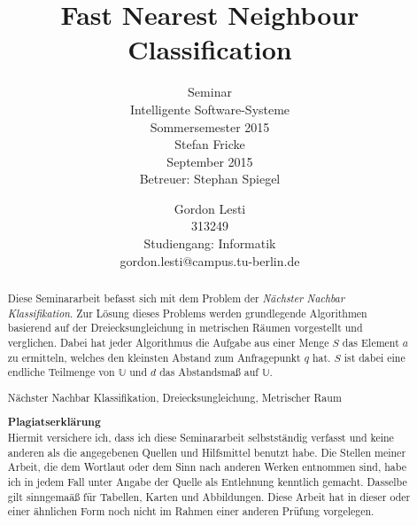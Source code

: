 \documentclass[deutsch,runningheads,a4paper]{llncs}
\newcommand{\keywords}[1]{\par\addvspace\baselineskip
\noindent\keywordname\enspace\ignorespaces#1}
\begin{document}
  \setcounter{tocdepth}{2}
  \makeatletter
  \renewcommand*\l@author[2]{}
  \renewcommand*\l@title[2]{}
  \makeatletter
  \title{Fast Nearest Neighbour Classification}
  \subtitle{\textnormal{\small{Seminar\\Intelligente Software-Systeme\\Sommersemester 2015}\\\vspace{1\baselineskip}
    Stefan Fricke\\\vspace{15\baselineskip} September 2015\\Betreuer: Stephan Spiegel\\\vspace{2\baselineskip}}}
  
  \author{Gordon Lesti\\313249\\Studiengang: Informatik\\gordon.lesti@campus.tu-berlin.de}
  
  
  \maketitle
  \newpage
  
  \begin{abstract}
    Diese Seminararbeit befasst sich mit dem Problem der \textit{Nächster Nachbar Klassifikation}. Zur Lösung dieses
    Problems werden grundlegende Algorithmen basierend auf der Dreiecksungleichung in metrischen Räumen vorgestellt und
    verglichen. Dabei hat jeder Algorithmus die Aufgabe aus einer Menge $S$ das Element $a$ zu ermitteln, welches den
    kleinsten Abstand zum Anfragepunkt $q$ hat. $S$ ist dabei eine endliche Teilmenge von $\mathbb{U}$ und $d$ das
    Abstandsmaß auf $\mathbb{U}$.
    \keywords{Nächster Nachbar Klassifikation, Dreiecksungleichung, Metrischer Raum}\\\vspace{4\baselineskip}
    
    \textbf{Plagiatserklärung}\\
    Hiermit versichere ich, dass ich diese Seminararbeit selbstständig verfasst und keine anderen als die angegebenen
    Quellen und Hilfsmittel benutzt habe. Die Stellen meiner Arbeit, die dem Wortlaut oder dem Sinn nach anderen Werken
    entnommen sind, habe ich in jedem Fall unter Angabe der Quelle als Entlehnung kenntlich gemacht. Dasselbe gilt
    sinngemaäß für Tabellen, Karten und Abbildungen. Diese Arbeit hat in dieser oder einer ähnlichen Form noch nicht im
    Rahmen einer anderen Prüfung vorgelegen.
  \end{abstract}
  
\end{document}
